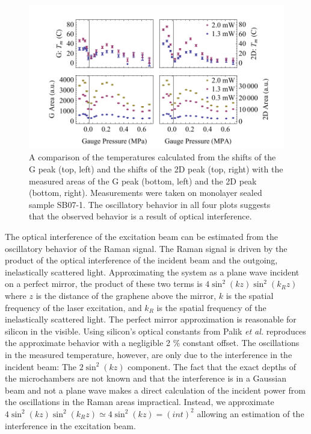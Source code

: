 \begin{figure}
	\begin{center}
	\includegraphics{Figs_Thermal/inter.pdf}
	\end{center}
	\caption[Issues with optical interference in thermal conductivity measurements]{\label{fig:therm:Inter}
		A comparison of the temperatures calculated from the shifts of the G peak (top, left) and the shifts of the 2D peak (top, right) with the measured areas of the G peak (bottom, left) and the 2D peak (bottom, right).
		Measurements were taken on monolayer sealed sample SB07-1.
		The oscillatory behavior in all four plots suggests that the observed behavior is a result of optical interference.
	}
\end{figure}

The optical interference of the excitation beam can be estimated from the oscillatory behavior of the Raman signal.
The Raman signal is driven by the product of the optical interference of the incident beam and the outgoing, inelastically scattered light.
Approximating the system as a plane wave incident on a perfect mirror, the product of these two terms is $4 \sin^2(k z) \sin^2(k_R z)$ where $z$ is the distance of the graphene above the mirror, $k$ is the spatial frequency of the laser excitation, and $k_R$ is the spatial frequency of the inelastically scattered light.
The perfect mirror approximation is reasonable for silicon in the visible.
Using silicon's optical constants from Palik \textit{et al.} \cite{Palik1991} reproduces the approximate behavior with a negligible 2 \% constant offset.
The oscillations in the measured temperature, however, are only due to the interference in the incident beam: The $2 \sin^2(k z)$ component.
The fact that the exact depths of the microchambers are not known and that the interference is in a Gaussian beam and not a plane wave makes a direct calculation of the incident power from the oscillations in the Raman areas impractical.
Instead, we approximate $4 \sin^2(k z) \sin^2(k_R z) \simeq 4 \sin^2(k z) = (int)^2$ allowing an estimation of the interference in the excitation beam.


